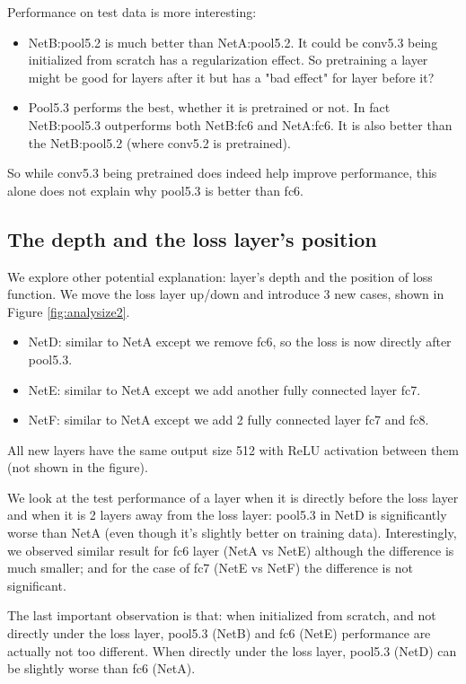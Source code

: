 \documentclass[10pt,twocolumn,letterpaper]{article}
\begin{document}
Performance on test data is more interesting:
\begin{itemize}
  \item NetB:pool5.2 is much better than NetA:pool5.2. It could be conv5.3 being initialized from scratch has a regularization effect. So pretraining a layer might be good for layers after it but has a "bad effect" for layer before it?
  \item Pool5.3 performs the best, whether it is pretrained or not. In fact NetB:pool5.3 outperforms both NetB:fc6 and NetA:fc6. It is also better than the NetB:pool5.2 (where conv5.2 is pretrained).
\end{itemize}

So while conv5.3 being pretrained does indeed help improve performance, this alone does not explain why pool5.3 is better than fc6.



\subsection{The depth and the loss layer's position}


We explore other potential explanation: layer's depth and the position of loss function. We move the loss layer up/down and introduce 3 new cases, shown in Figure \ref{fig:analysize2}.
\begin{itemize}
  \item NetD: similar to NetA except we remove fc6, so the loss is now directly after pool5.3.
  \item NetE: similar to NetA except we add another fully connected layer fc7.
  \item NetF: similar to NetA except we add 2 fully connected layer fc7 and fc8.
\end{itemize}




All new layers have the same output size 512 with ReLU activation between them (not shown in the figure).

We look at the test performance of a layer when it is directly before the loss layer and when it is 2 layers away from the loss layer: pool5.3 in NetD is significantly worse than NetA (even though it's slightly better on training data). Interestingly, we observed similar result for fc6 layer (NetA vs NetE) although the difference is much smaller; and for the case of fc7 (NetE vs NetF) the difference is not significant.

The last important observation is that: when initialized from scratch, and not directly under the loss layer, pool5.3 (NetB) and fc6 (NetE) performance are actually not too different. When directly under the loss layer, pool5.3 (NetD) can be slightly worse than fc6 (NetA).
\end{document}
